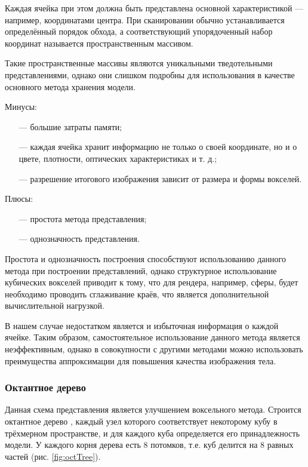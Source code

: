 Каждая ячейка при этом должна быть представлена основной 
характеристикой --- например, координатами центра.
При сканировании 
обычно устанавливается определённый порядок обхода, а соответствующий 
упорядоченный набор координат называется пространственным массивом.

Такие пространственные массивы являются уникальными тведотельными 
представлениями, однако они слишком подробны для использования в качестве 
основного метода хранения модели.

Минусы:
\begin{itemize}[leftmargin=1.6\parindent]
	\item[---] большие затраты памяти;
	\item[---] каждая ячейка хранит информацию не только о своей координате, но и о цвете, плотности, оптических характеристиках и т. д.;
	\item[---] разрешение итогового изображения зависит от размера и формы вокселей.
\end{itemize}

Плюсы:
\begin{itemize}[leftmargin=1.6\parindent]
	\item[---] простота метода представления;
	\item[---] однозначность представления.
\end{itemize}

Простота и однозначность построения способствуют использованию 
данного метода при построении представлений, однако структурное 
использование кубических вокселей приводит к тому, что для рендера, например, сферы, будет необходимо проводить сглаживание краёв, что 
является дополнительной вычислительной нагрузкой.

В нашем случае недостатком является и избыточная информация о 
каждой ячейке.
Таким образом, самостоятельное использование данного метода 
является неэффективным, однако в совокупности с другими методами можно 
использовать преимущества аппроксимации для повышения качества 
изображения тела.

\subsubsection{Октантное дерево}

Данная схема представления является улучшением воксельного метода. 
Строится октантное дерево \cite{numeric-octree}, каждый узел которого соответствует некоторому 
кубу в трёхмерном пространстве, и для каждого куба определяется его 
принадлежность модели.
У каждого корня дерева есть 8 потомков, т.е. куб 
делится на 8 равных частей (рис. \ref{fig:octTree}).
\newpage

